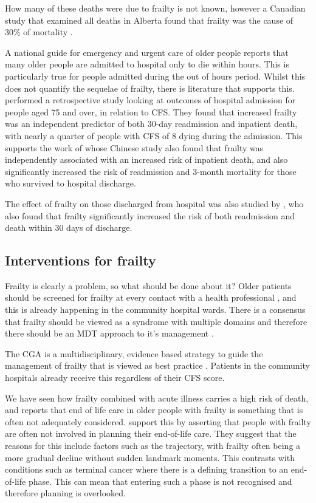 \documentclass
[
	12pt,
	a4paper,
	oneside,
]{article}
\begin{document}
How many of these deaths were due to frailty is not known, however 
a Canadian study that examined all deaths in Alberta found that frailty was the
cause of 30\% of mortality \parencite{fassbender:09}.

A national guide for emergency and urgent care of older people \parencite{silver:12}
reports that many older people are admitted to hospital only to die within hours.
This is particularly true for people admitted during the out of hours period.
Whilst this does not quantify the sequelae of frailty, there is literature that 
supports this. \textcite{wallis:15} performed a retrospective study looking 
at outcomes of hospital admission for people aged 75 and over, in relation to CFS. 
They found that increased frailty was an independent predictor of both 30-day
readmission and inpatient death, with nearly a quarter of people with CFS of 8 dying 
during the admission. This supports the work of \textcite{kang:15} whose Chinese 
study also found that frailty was independently associated with an increased risk of 
inpatient death, and also significantly increased the risk of readmission and 
3-month mortality for those who survived to hospital discharge.

The effect of frailty on those discharged from hospital was also studied by 
\parencite{kahlon:15}, who also found that frailty significantly increased the 
risk of both readmission and death within 30 days of discharge.

\subsection{Interventions for frailty}
Frailty is clearly a problem, so what should be done about it? Older patients 
should be screened for frailty at every contact with a health professional 
\parencite{bgs:14}, and 
this is already happening in the community hospital wards. There is a consensus that 
frailty should be viewed as a syndrome with multiple domains and therefore
there should be an MDT approach to it's management \parencite{vellas:16}.

The CGA is a multidisciplinary, evidence based strategy to guide the management 
of frailty that is viewed as best practice \parencite{silver:12, bgs:14, oliver:14}. Patients
in the community hospitals already receive this regardless of their CFS score.

We have seen how frailty combined with acute illness carries a high risk of death, and 
\textcite{silver:12} reports that end of life care in older people with frailty
is something that is often not adequately considered. \textcite{oliver:14} support this
by asserting that people with frailty are often not involved in planning their 
end-of-life care. They suggest that the reasons for this include factors such as
the trajectory, with frailty often being a more gradual decline without sudden 
landmark moments. This contrasts with conditions such as terminal cancer where there 
is a defining transition to an end-of-life phase. This can mean that entering such a
phase is not recognised and therefore planning is overlooked. 
\end{document}
